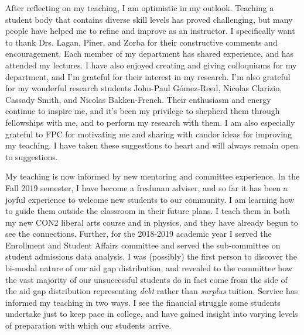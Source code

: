 \documentclass[../../main.tex]{subfiles}
\begin{document}
After reflecting on my teaching, I am optimistic in my outlook.  Teaching a student body that contains diverse skill levels has proved challenging, but many people have helped me to refine and improve as an instructor.  I specifically want to thank Drs. Lagan, Piner, and Zorba for their constructive comments and encouragement.  Each member of my department has shared experience, and has attended my lectures.  I have also enjoyed creating and giving colloquiums for my department, and I'm grateful for their interest in my research.  I'm also grateful for my wonderful research students John-Paul G\'omez-Reed, Nicolas Clarizio, Cassady Smith, and Nicolas Bakken-French.  Their enthusiasm and energy continue to inspire me, and it's been my privilege to shepherd them through fellowships with me, and to perform my research with them. I am also especially grateful to FPC for motivating me and sharing with candor ideas for improving my teaching.  I have taken these suggestions to heart and will always remain open to suggestions.  \\ \hspace{0.1cm}

My teaching is now informed by new mentoring and committee experience.  In the Fall 2019 semester, I have become a freshman adviser, and so far it has been a joyful experience to welcome new students to our community.  I am learning how to guide them outside the classroom in their future plans.  I teach them in both my new CON2 liberal arts course and in physics, and they have already begun to see the connections.  Further, for the 2018-2019 academic year I served the Enrollment and Student Affairs committee and served the sub-committee on student admissions data analysis.  I was (possibly) the first person to discover the bi-modal nature of our aid gap distribution, and revealed to the committee how the vast majority of our unsuccessful students do in fact come from the side of the aid gap distribution representing \textit{debt} rather than \textit{surplus} tuition.  Service has informed my teaching in two ways.  I see the financial struggle some students undertake just to keep pace in college, and have gained insight into varying levels of preparation with which our students arrive.  \\ \hspace{0.1cm}
\end{document}
